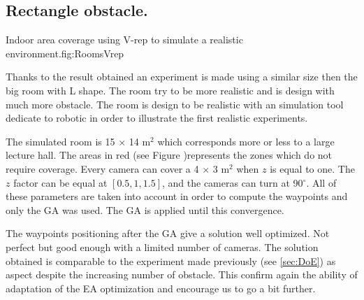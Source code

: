 	\subsection{Rectangle obstacle.}
	\begin{mfigures}[!]{Indoor area coverage using V-rep to simulate a realistic environment.}{fig:RoomsVrep} \centering
{}
\hspace{1cm}
\hspace{1cm}

\tabsimuposeVrep
\end{mfigures}
	Thanks to the result obtained an experiment is made using a similar size then the big room with L shape. The room try to be more realistic and is design with much more obstacle. The room is design to be realistic with an simulation tool dedicate to robotic in order to illustrate the first realistic experiments.
	     
	The simulated room is 15 $\times$ 14 m$^2$ which corresponds more or less to a large lecture hall. The areas in red (see Figure )represents the zones which do not require coverage. Every camera can cover a 4 $\times$ 3 m$^2$  when $z$ is equal to one. The $z$ factor can be equal at $[0.5, 1, 1.5]$, and the cameras can turn  at 90$^{\circ}$. All of these parameters are taken into account in order to compute the waypoints and only the GA was used. The GA is applied until this convergence. 
	
	The waypoints positioning after the GA give a solution well optimized. Not perfect but good enough with a limited number of cameras. The solution obtained is comparable to the experiment made previously (see \ref{sec:DoE}) as aspect despite the increasing number of obstacle. This confirm again the ability of adaptation of the EA optimization and encourage us to go a bit further. 


